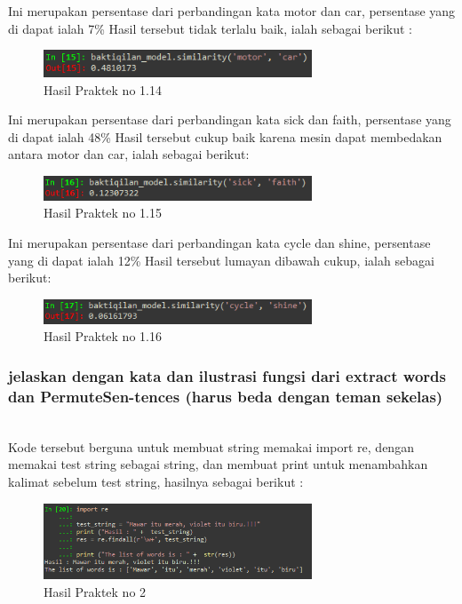 
Ini merupakan persentase dari perbandingan kata motor dan car, persentase yang di dapat ialah 7\% Hasil tersebut tidak terlalu baik, ialah sebagai berikut :
\begin{figure}[H]
	\centering
	\includegraphics[width=8cm]{figures/1174083/figures5/32.png}
	\caption{Hasil Praktek no 1.14}
\end{figure}


Ini merupakan persentase dari perbandingan kata sick dan faith, persentase yang di dapat ialah 48\% Hasil tersebut cukup baik karena mesin dapat membedakan antara motor dan car, ialah sebagai berikut:
\begin{figure}[H]
	\centering
	\includegraphics[width=8cm]{figures/1174083/figures5/33.png}
	\caption{Hasil Praktek no 1.15}
\end{figure}


Ini merupakan persentase dari perbandingan kata cycle dan shine, persentase yang di dapat ialah 12\% Hasil tersebut lumayan dibawah cukup, ialah sebagai berikut:
\begin{figure}[H]
	\centering
	\includegraphics[width=8cm]{figures/1174083/figures5/34.png}
	\caption{Hasil Praktek no 1.16}
\end{figure}

\subsubsection{jelaskan dengan kata dan ilustrasi fungsi dari extract words dan PermuteSen-tences (harus beda dengan teman sekelas)}
\hfill\\

Kode tersebut berguna untuk membuat string memakai import re, dengan memakai test string sebagai string, dan membuat print untuk menambahkan kalimat sebelum test string, hasilnya sebagai berikut :
\begin{figure}[H]
	\centering
	\includegraphics[width=8cm]{figures/1174083/figures5/35.png}
	\caption{Hasil Praktek no 2}
\end{figure}

